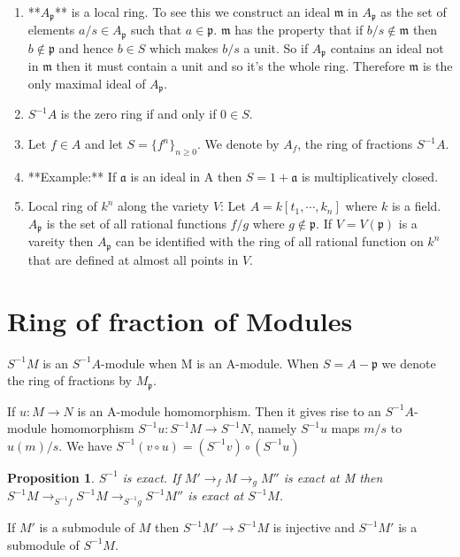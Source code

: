 \documentclass[]{report}
\newtheorem{prop}[theorem]{Proposition}
\begin{document}
\begin{enumerate}
    \item **$A_\mathfrak{p}$** is a local ring. To see this we construct an ideal $\mathfrak{m}$ in $A_\mathfrak{p}$ as the set of elements $a/s \in A_\mathfrak{p}$ such that $a\in \mathfrak{p}$. $\mathfrak{m}$ has the property that if $b/s\not \in \mathfrak{m}$ then $b\not \in \mathfrak{p}$ and hence $b\in S$ which makes $b/s$ a unit. So if $A_\mathfrak{p}$ contains an ideal not in $\mathfrak{m}$ then it must contain a unit and so it's the whole ring. Therefore $\mathfrak{m}$ is the only maximal ideal of $A_\mathfrak{p}$. 
    \item $S^{-1}A$ is the zero ring if and only if $0\in S$. 
    \item Let $f\in A$ and let $S = \{f^n\}_{n\geq 0}$. We denote by $A_f$, the ring of fractions $S^{-1}A$.
    \item **Example:** If $\mathfrak{a}$ is an ideal in A then $S = 1+\mathfrak{a}$ is multiplicatively closed. 
    \item Local ring of $k^n$ along the variety $V$: Let $A = k[t_1,\cdots,k_n]$ where $k$ is a field. $A_\mathfrak{p}$ is the set of all rational functions $f/g$ where $g\not \in \mathfrak{p}$. If $V = V(\mathfrak{p})$ is a vareity then $A_\mathfrak{p}$ can be identified with the ring of all rational function on $k^n$ that are defined at almost all points in $V$. 
\end{enumerate}

\section{Ring of fraction of Modules}

$S^{-1}M$ is an $S^{-1}A$-module when M is an A-module. When $S = A-\mathfrak{p}$ we denote the ring of fractions by $M_\mathfrak{p}$.

If $u: M\rightarrow N$ is an A-module homomorphism. Then it gives rise to an $S^{-1}A$-module homomorphism $S^{-1}u: S^{-1}M \rightarrow S^{-1}N$, namely $S^{-1}u$ maps $m/s$ to $u(m)/s$. We have $S^{-1}(v\circ u) = (S^{-1}v) \circ (S^{-1}u)$

\begin{prop}
    $S^{-1}$ is exact.  If $M'\rightarrow_f M \rightarrow_g M''$ is exact at M then $S^{-1}M \rightarrow_{S^{-1}f} S^{-1}M \rightarrow_{S^{-1}g} S^{-1}M''$ is exact at $S^{-1}M$. 
\end{prop}

If $M'$ is a submodule of $M$ then $S^{-1}M' \rightarrow S^{-1}M$ is injective and $S^{-1}M'$ is a submodule of $S^{-1}M$. 
\end{document}
